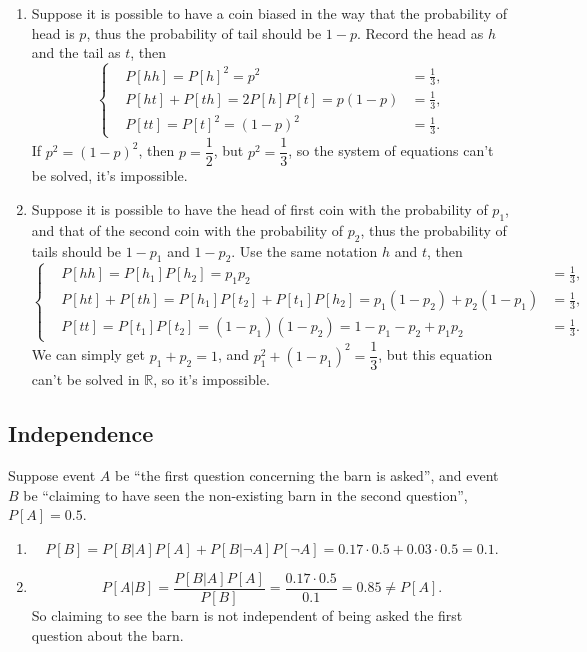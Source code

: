 \documentclass[11pt,a4paper]{article}
\begin{document}
\begin{enumerate}[label=\roman*)]
\item
Suppose it is possible to have a coin biased in the way that the probability of head is $p$, thus the probability of tail should be $1-p$. Record the head as $h$ and the tail as $t$, then
$$\left\{
\begin{aligned}
&P[hh]=P[h]^2=p^2&=\frac{1}{3},\\
&P[ht]+P[th]=2P[h]P[t]=p(1-p)&=\frac{1}{3},\\
&P[tt]=P[t]^2=(1-p)^2&=\frac{1}{3}.
\end{aligned}\right.
$$
If $p^2=(1-p)^2$, then $p=\dfrac{1}{2}$, but $p^2=\dfrac{1}{3}$, so
the system of equations can't be solved, it's impossible. \bigskip
\item
Suppose it is possible to have the head of first coin with the probability of $p_1$, and that of the second coin with the probability of $p_2$, thus the probability of tails should be $1-p_1$ and $1-p_2$. Use the same notation $h$ and $t$, then
$$\left\{
\begin{aligned}
&P[hh]=P[h_1]P[h_2]=p_1p_2&=\frac{1}{3},\\
&P[ht]+P[th]=P[h_1]P[t_2]+P[t_1]P[h_2]=p_1(1-p_2)+p_2(1-p_1)&=\frac{1}{3},\\
&P[tt]=P[t_1]P[t_2]=(1-p_1)(1-p_2)=1-p_1-p_2+p_1p_2&=\frac{1}{3}.
\end{aligned}\right.
$$
We can simply get $p_1+p_2=1$, and $p_1^2+(1-p_1)^2=\dfrac{1}{3}$, but this equation can't be solved in $\mathbb{R}$, so it's impossible.
\end{enumerate}

\subsection{Independence}

Suppose event $A$ be ``the first question concerning the barn is asked'', and event $B$ be ``claiming to have seen the non-existing barn in the second question'', $P[A]=0.5$.
\begin{enumerate}[label=\roman*)]
\item
$$P[B]=P[B|A]P[A]+P[B|\neg A]P[\neg A]=0.17\cdot0.5+0.03\cdot0.5=0.1.$$
\item
$$P[A|B]=\frac{P[B|A]P[A]}{P[B]}=\frac{0.17\cdot0.5}{0.1}=0.85\neq P[A].$$
So claiming to see the barn is not independent of being asked the first question about the barn.
\end{enumerate}
\end{document}
